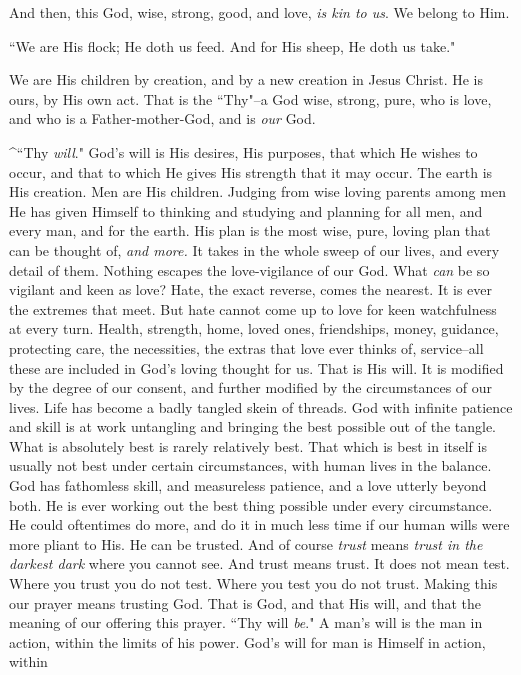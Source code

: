 And then, this God, wise, strong, good, and love, \textit{is kin to us}. We
belong to Him.

    ``We are His flock;
    He doth us feed.
    And for His sheep,
    He doth us take."

We are His children by creation, and by a new creation in Jesus Christ. He
is ours, by His own act. That is the ``Thy"--a God wise, strong, pure, who
is love, and who is a Father-mother-God, and is \textit{our} God.

^``Thy \textit{will}." God's will is His desires, His purposes, that which He
wishes to occur, and that to which He gives His strength that it may
occur. The earth is His creation. Men are His children. Judging from wise
loving parents among men He has given Himself to thinking and studying and
planning for all men, and every man, and for the earth. His plan is the
most wise, pure, loving plan that can be thought of, \textit{and more.} It takes
in the whole sweep of our lives, and every detail of them. Nothing escapes
the love-vigilance of our God. What \textit{can} be so vigilant and keen as love?
Hate, the exact reverse, comes the nearest. It is ever the extremes that
meet. But hate cannot come up to love for keen watchfulness at every
turn. Health, strength, home, loved ones, friendships, money, guidance,
protecting care, the necessities, the extras that love ever thinks of,
service--all these are included in God's loving thought for us. That is
His will. It is modified by the degree of our consent, and further
modified by the circumstances of our lives. Life has become a badly
tangled skein of threads. God with infinite patience and skill is at work
untangling and bringing the best possible out of the tangle. What is
absolutely best is rarely relatively best. That which is best in itself is
usually not best under certain circumstances, with human lives in the
balance. God has fathomless skill, and measureless patience, and a love
utterly beyond both. He is ever working out the best thing possible under
every circumstance. He could oftentimes do more, and do it in much less
time if our human wills were more pliant to His. He can be trusted. And of
course \textit{trust} means \textit{trust in the darkest dark} where you cannot see. And
trust means trust. It does not mean test. Where you trust you do not test.
Where you test you do not trust. Making this our prayer means trusting
God. That is God, and that His will, and that the meaning of our offering
this prayer. ``Thy will \textit{be}." A man's will is the man in action, within
the limits of his power. God's will for man is Himself in action, within
